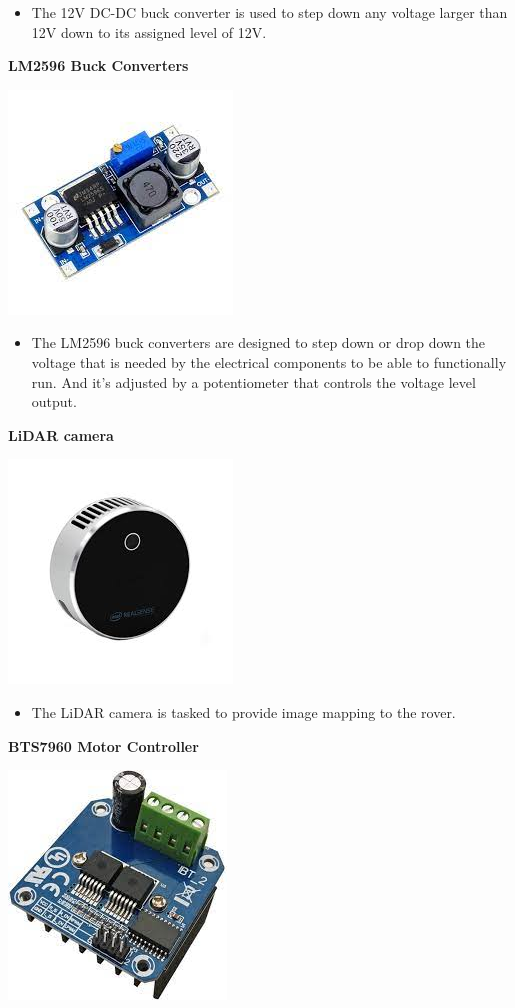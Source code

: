 \documentclass[a4paper, 10pt]{article}
\begin{document}
\begin{itemize}
\item
	The 12V DC-DC buck converter is used to step down any voltage larger than 12V down to its assigned level of 12V.
\end{itemize}


\textbf{LM2596 Buck Converters}

\includegraphics[scale=0.5]{LM2596 bucks}

\begin{itemize}
\item
	The LM2596 buck converters are designed to step down or drop down the voltage that is needed by the electrical components to be able to functionally run. And it's adjusted by a potentiometer that controls the voltage level output.
\end{itemize}


\textbf{LiDAR camera}

\includegraphics[scale=0.5]{LiDAR Camera}

\begin{itemize}
\item
	The LiDAR camera is tasked to provide image mapping to the rover.
\end{itemize}


\textbf{BTS7960 Motor Controller}

\includegraphics[scale=0.5]{BTS7960 Motor Driver}
\end{document}
